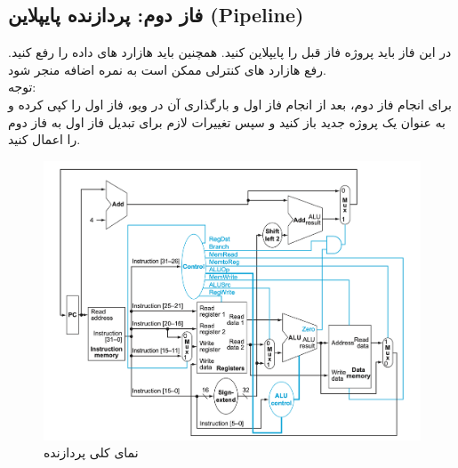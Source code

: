 \subsection{فاز دوم: پردازنده پایپلاین (Pipeline)}
{در این فاز باید پروژه فاز قبل را پایپلاین کنید. همچنین باید هازارد های داده را رفع کنید. رفع هازارد های کنترلی ممکن است به نمره اضافه منجر شود.}\\
{توجه:}\\
{برای انجام فاز دوم، بعد از انجام فاز اول و بارگذاری آن در ویو، فاز اول را کپی کرده و به عنوان یک پروژه جدید باز کنید و سپس تغییرات لازم برای تبدیل فاز اول به فاز دوم را اعمال کنید. }\\
\begin{figure}[H]
    \centering
    \includegraphics[width=\textwidth]{images/MIPS_Single_Cycle_Processor.png}
    \caption{نمای کلی پردازنده}
    \label{MIPS_Single_Cycle_Processor}
\end{figure}\\







